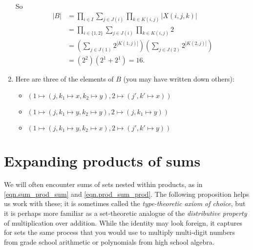 \documentclass[Book-Poly]{subfiles}
\begin{document}
\begin{exercise}
\begin{solution}
\begin{enumerate}
            So
            \begin{align*}
                |B| &= \prod_{i\in I}\sum_{j\in J(i)}\prod_{k\in K(i,j)}|X(i,j,k)| \\
                &= \prod_{i\in \{1,2\}}\sum_{j\in J(i)}\prod_{k\in K(i,j)}2 \\
                &= \left(\sum_{j\in J(1)} 2^{|K(1,j)|}\right)\left(\sum_{j\in J(2)} 2^{|K(2,j)|}\right) \\
                &= \left(2^2\right)\left(2^1 + 2^1\right) = 16.
            \end{align*}
            \item Here are three of the elements of $B$ (you may have written down others):
            \begin{itemize}
                \item $(1 \mapsto (j, k_1 \mapsto x, k_2 \mapsto y), 2 \mapsto (j', k' \mapsto x))$
                \item $(1 \mapsto (j, k_1 \mapsto y, k_2 \mapsto y), 2 \mapsto (j, k_1 \mapsto y))$
                \item $(1 \mapsto (j, k_1 \mapsto y, k_2 \mapsto x), 2 \mapsto (j', k' \mapsto y))$
            \end{itemize}
            \qedhere
        \end{enumerate}
    \end{solution}
\end{exercise}


\section{Expanding products of sums} \label{sec.poly.rep-sets.expand}

We will often encounter sums of sets nested within products, as in \eqref{eqn.sum_prod_sum} and \eqref{eqn.prod_sum_prod}.
The following proposition helps us work with these; it is sometimes called the \emph{type-theoretic axiom of choice}, but it is perhaps more familiar as a set-theoretic analogue of the \emph{distributive property} of multiplication over addition.
While the identity may look foreign, it captures for sets the same process that you would use to multiply multi-digit numbers from grade school arithmetic or polynomials from high school algebra.
\end{document}
